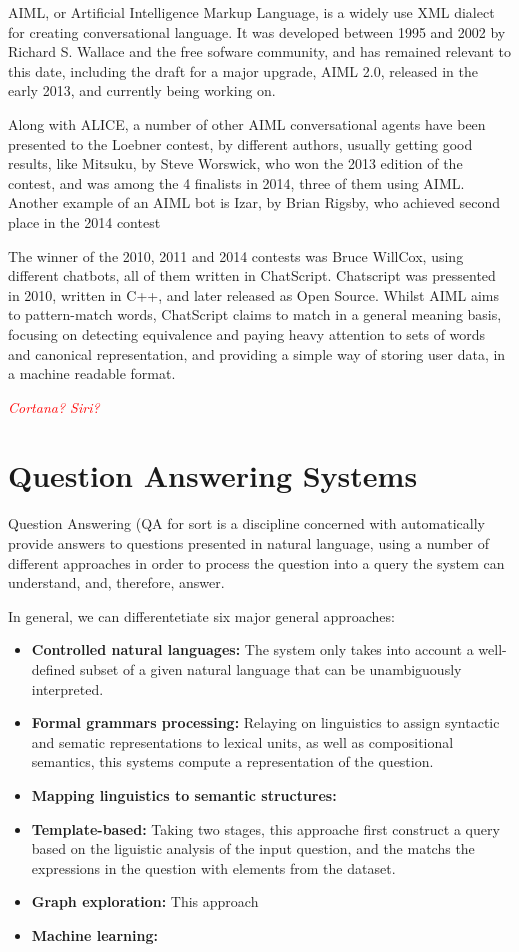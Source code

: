 AIML, or Artificial Intelligence Markup Language, is a widely use XML dialect for creating conversational language. It was developed between 1995 and 2002 by Richard S. Wallace and the free sofware community, and has remained relevant to this date, including the draft for a major upgrade, AIML 2.0, released in the early 2013, and currently being working on.

Along with ALICE, a number of other AIML conversational agents have been presented to the Loebner contest, by different authors, usually getting good results, like Mitsuku, by Steve Worswick, who won the 2013 edition of the contest, and was among the 4 finalists in 2014, three of them using AIML. Another example of an AIML bot is Izar, by Brian Rigsby, who achieved second place in the 2014 contest

The winner of the 2010, 2011 and 2014 contests was Bruce WillCox, using different chatbots, all of them written in ChatScript. Chatscript was pressented in 2010, written in C++, and later released as Open Source. Whilst AIML aims to pattern-match words, ChatScript claims to match in a general meaning basis, focusing on detecting equivalence and paying heavy attention to sets of words and canonical representation, and providing a simple way of storing user data, in a machine readable format.

\emph{\textcolor{red}{Cortana? Siri?}}

\section{Question Answering Systems}
\label{sec:qa_sys}

Question Answering (QA for sort is a discipline concerned with automatically provide answers to questions presented in natural language, using a number of different approaches in order to process the question into a query the system can understand, and, therefore, answer.

In general, we can differentetiate six major general approaches:

\begin{itemize}
  \item \textbf{Controlled natural languages:} The system only takes into account a well-defined subset of a given natural language that can be unambiguously interpreted.
  \item \textbf{Formal grammars processing:} Relaying on linguistics to assign syntactic and sematic representations to lexical units, as well as compositional semantics, this systems compute a representation of the question.
  \item \textbf{Mapping linguistics to semantic structures: }
  \item \textbf{Template-based:} Taking two stages, this approache first construct a query based on the liguistic analysis of the input question, and the matchs the expressions in the question with elements from the dataset.
  \item \textbf{Graph exploration:} This approach 
  \item \textbf{Machine learning:}
\end{itemize}

